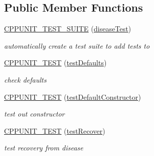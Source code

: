 \subsection*{Public Member Functions}
\begin{DoxyCompactItemize}
\item 
\mbox{\label{classdiseaseTest_af7f1b00d3ae875d3314e3c5c6020212a}} 
\mbox{\hyperlink{classdiseaseTest_af7f1b00d3ae875d3314e3c5c6020212a}{C\+P\+P\+U\+N\+I\+T\+\_\+\+T\+E\+S\+T\+\_\+\+S\+U\+I\+TE}} (\mbox{\hyperlink{classdiseaseTest}{disease\+Test}})
\begin{DoxyCompactList}\small\item\em automatically create a test suite to add tests to \end{DoxyCompactList}\item 
\mbox{\label{classdiseaseTest_aa0f6c0aa41fae9d84b8d36f099e66153}} 
\mbox{\hyperlink{classdiseaseTest_aa0f6c0aa41fae9d84b8d36f099e66153}{C\+P\+P\+U\+N\+I\+T\+\_\+\+T\+E\+ST}} (\mbox{\hyperlink{classdiseaseTest_a76ac8d52f421ccb010d5be72228fe613}{test\+Defaults}})
\begin{DoxyCompactList}\small\item\em check defaults \end{DoxyCompactList}\item 
\mbox{\label{classdiseaseTest_a9c6fb710bc0f891eb89c2b47b234e902}} 
\mbox{\hyperlink{classdiseaseTest_a9c6fb710bc0f891eb89c2b47b234e902}{C\+P\+P\+U\+N\+I\+T\+\_\+\+T\+E\+ST}} (\mbox{\hyperlink{classdiseaseTest_a1559f0bcf9c829f890b891ded00c746f}{test\+Default\+Constructor}})
\begin{DoxyCompactList}\small\item\em test out constructor \end{DoxyCompactList}\item 
\mbox{\label{classdiseaseTest_aab2e2a22338a2752edf1a41e869befdf}} 
\mbox{\hyperlink{classdiseaseTest_aab2e2a22338a2752edf1a41e869befdf}{C\+P\+P\+U\+N\+I\+T\+\_\+\+T\+E\+ST}} (\mbox{\hyperlink{classdiseaseTest_af072ce110dc0cb4e4dfd7938e03e01f4}{test\+Recover}})
\begin{DoxyCompactList}\small\item\em test recovery from disease \end{DoxyCompactList}\item 

\end{DoxyCompactItemize}
